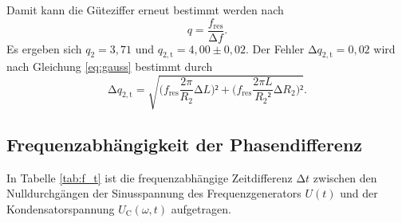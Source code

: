 Damit kann die Güteziffer erneut bestimmt werden nach 
\begin{equation}
q=\frac{f_\mathup{res}}{\mathup{\Delta}{f}}.
\label{eq:formel}
\end{equation}
 Es ergeben sich $q_2=3,71$ und $q_{2,\mathup{t}}=4,00\pm0,02$. Der Fehler $\mathup{\Delta}{q_{2,\mathup{t}}}=0,02$ wird nach Gleichung \eqref{eq:gauss}  bestimmt durch
\begin{equation}
\mathup{\Delta}{q_{2,\mathup{t}}}=\sqrt{\biggl(f_\mathup{res}\frac{2\pi}{R_2}\mathup{\Delta}{L}\biggr)²+\biggl(f_\mathup{res}\frac{2\pi L}{{R_2}²}\mathup{\Delta}{R_2}\biggr)²}.
\end{equation}

\subsection{Frequenzabhängigkeit der Phasendifferenz}
In Tabelle \ref{tab:f_t} ist die frequenzabhängige Zeitdifferenz $\mathup{\Delta}{t}$ zwischen den Nulldurchgängen der Sinusspannung des Frequenzgenerators $U(t)$ und der Kondensatorspannung $U_\mathup{C}(\omega, t)$ aufgetragen. 
